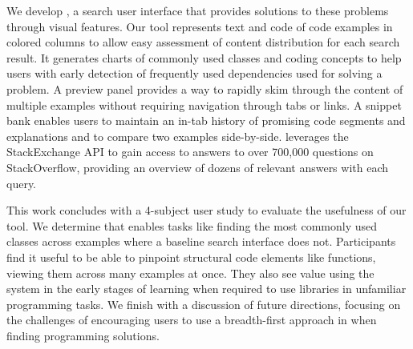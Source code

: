 We develop \systemname{}, a search user interface that provides solutions to these problems through visual features.
Our tool represents text and code of code examples in colored columns to allow easy assessment of content distribution for each search result.
It generates charts of commonly used classes and coding concepts to help users with early detection of frequently used dependencies used for solving a problem.
A preview panel provides a way to rapidly skim through the content of multiple examples without requiring navigation through tabs or links.
A snippet bank enables users to maintain an in-tab history of promising code segments and explanations and to compare two examples side-by-side.
\systemname{} leverages the StackExchange API to gain access to answers to over 700,000 questions on StackOverflow, providing an overview of dozens of relevant answers with each query.

This work concludes with a 4-subject user study to evaluate the usefulness of our tool.
We determine that \systemname{} enables tasks like finding the most commonly used classes across examples where a baseline search interface does not.
Participants find it useful to be able to pinpoint structural code elements like functions, viewing them across many examples at once.
They also see value using the system in the early stages of learning when required to use libraries in unfamiliar programming tasks.
We finish with a discussion of future directions, focusing on the challenges of encouraging users to use a breadth-first approach in when finding programming solutions.